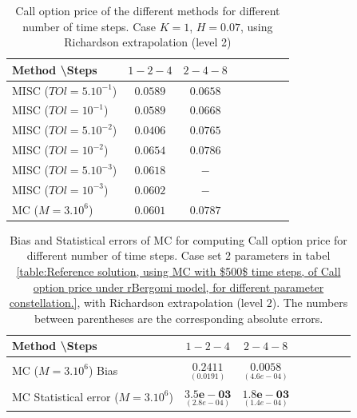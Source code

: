 \documentclass[11pt]{article}
\begin{document}
\begin{table}[h!]
	\centering
	\begin{tabular}{l*{6}{c}r}
		Method \textbackslash  Steps           &$1-2-4$ & $2-4-8$ \\
		\hline
		MISC ($TOl=5.10^{-1}$)& $0.0589$  & $0.0658$ \\
		
		MISC ($TOl=10^{-1}$)  &$0.0589$  &$0.0668$   \\
		MISC ($TOl=5.10^{-2}$)  & $0.0406$ & $0.0765$  \\
		MISC ($TOl=10^{-2}$)  & $	0.0654$ & $0.0786$   \\
		MISC ($TOl=5.10^{-3}$)  & $	0.0618$ & $-$   \\
		MISC ($TOl=10^{-3}$)  & $0.0602	$ & $-$  \\
		\hline
		MC ($M=3.10^6$)  & $  0.0601$ & $ 0.0787$   \\
		\hline 
	\end{tabular}
	\caption{ Call option price of the different methods for different number of time steps. Case $K=1$, $H=0.07$, using Richardson extrapolation (level 2)}
	\label{table: Call option price of the different methods for different number of time steps. Case $K=1,H=0.07$, using Richardson extrapolation_level2}
\end{table}




\begin{table}[h!]
	\centering
	\begin{tabular}{l*{6}{c}r}
		Method \textbackslash  Steps            & $1-2-4$ & $2-4-8$  \\
		\hline
		MC ($M=3.10^6$)  Bias   &$\underset{(  0.0191)}{\mathbf{  0.2411}}$  & $\underset{(      4.6e-04)}{\mathbf{  0.0058}}$   \\	
		
		MC Statistical error ($M=3.10^6$)   & $\underset{( 2.8e-04)}{\mathbf{3.5e-03}}$  & $\underset{(   1.4e-04)}{\mathbf{    1.8e-03}}$  \\	
		
		
		
		\hline
	\end{tabular}
	\caption{Bias and Statistical errors of MC   for computing Call option price  for different number of time steps. Case set $2$ parameters in tabel \ref{table:Reference solution, using MC with $500$ time steps, of Call option price under rBergomi model, for different parameter constellation.}, with Richardson extrapolation (level $2$). The numbers between parentheses are the corresponding absolute errors.}
	\label{Bias and Statistical errors of MC ($M=3.10^6$)  for computing Call option price  for different number of time steps. Case set $2$ parameters, with Richardson extrapolation (level2). The numbers between parentheses are the corresponding absolute errors.}
\end{table}
\end{document}
